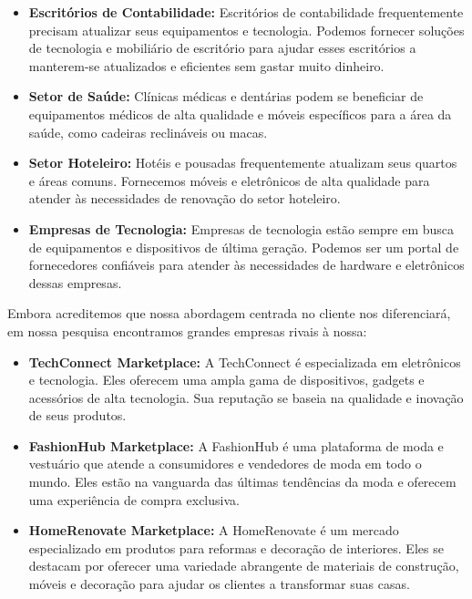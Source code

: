 \documentclass[
	12pt,				%
	openright,			%
	twoside,			%
	a4paper,			%
	english,			%
	brazil				%
	]{abntex2}
\begin{document}
\begin{itemize}
    \item \textbf{Escritórios de Contabilidade:} Escritórios de contabilidade frequentemente precisam atualizar seus equipamentos e tecnologia. Podemos fornecer soluções de tecnologia e mobiliário de escritório para ajudar esses escritórios a manterem-se atualizados e eficientes sem gastar muito dinheiro.

    \item \textbf{Setor de Saúde:} Clínicas médicas e dentárias podem se beneficiar de equipamentos médicos de alta qualidade e móveis específicos para a área da saúde, como cadeiras reclináveis ou macas.

    \item \textbf{Setor Hoteleiro:} Hotéis e pousadas frequentemente atualizam seus quartos e áreas comuns. Fornecemos móveis e eletrônicos de alta qualidade para atender às necessidades de renovação do setor hoteleiro.

    \item \textbf{Empresas de Tecnologia:} Empresas de tecnologia estão sempre em busca de equipamentos e dispositivos de última geração. Podemos ser um portal de fornecedores confiáveis para atender às necessidades de hardware e eletrônicos dessas empresas.
\end{itemize}

Embora acreditemos que nossa abordagem centrada no cliente nos diferenciará, em nossa pesquisa encontramos grandes empresas rivais à nossa:

\begin{itemize}
	\item \textbf{TechConnect Marketplace:} A TechConnect é especializada em eletrônicos e tecnologia. Eles oferecem uma ampla gama de dispositivos, gadgets e acessórios de alta tecnologia. Sua reputação se baseia na qualidade e inovação de seus produtos.

	\item \textbf{FashionHub Marketplace:} A FashionHub é uma plataforma de moda e vestuário que atende a consumidores e vendedores de moda em todo o mundo. Eles estão na vanguarda das últimas tendências da moda e oferecem uma experiência de compra exclusiva.

	\item \textbf{HomeRenovate Marketplace:} A HomeRenovate é um mercado especializado em produtos para reformas e decoração de interiores. Eles se destacam por oferecer uma variedade abrangente de materiais de construção, móveis e decoração para ajudar os clientes a transformar suas casas.

\end{itemize}
\end{document}
